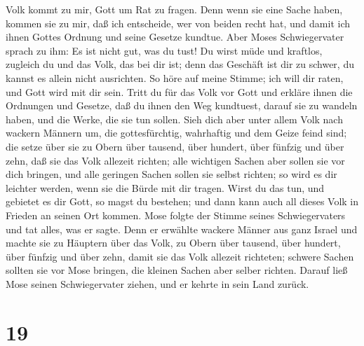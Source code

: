 Volk kommt zu mir, Gott um Rat zu fragen.  Denn wenn sie
eine Sache haben, kommen sie zu mir, daß ich entscheide, wer von beiden
recht hat, und damit ich ihnen Gottes Ordnung und seine Gesetze kundtue.
 Aber Moses Schwiegervater sprach zu ihm: Es ist nicht
gut, was du tust!  Du wirst müde und kraftlos, zugleich
du und das Volk, das bei dir ist; denn das Geschäft ist dir zu schwer,
du kannst es allein nicht ausrichten.  So höre auf meine
Stimme; ich will dir raten, und Gott wird mit dir sein. Tritt du für das
Volk vor Gott  und erkläre ihnen die Ordnungen und
Gesetze, daß du ihnen den Weg kundtuest, darauf sie zu wandeln haben,
und die Werke, die sie tun sollen.  Sieh dich aber unter
allem Volk nach wackern Männern um, die gottesfürchtig, wahrhaftig und
dem Geize feind sind; die setze über sie zu Obern über tausend, über
hundert, über fünfzig und über zehn,  daß sie das Volk
allezeit richten; alle wichtigen Sachen aber sollen sie vor dich
bringen, und alle geringen Sachen sollen sie selbst richten; so wird es
dir leichter werden, wenn sie die Bürde mit dir tragen. 
Wirst du das tun, und gebietet es dir Gott, so magst du bestehen; und
dann kann auch all dieses Volk in Frieden an seinen Ort kommen.
 Mose folgte der Stimme seines Schwiegervaters und tat
alles, was er sagte.  Denn er erwählte wackere Männer aus
ganz Israel und machte sie zu Häuptern über das Volk, zu Obern über
tausend, über hundert, über fünfzig und über zehn,  damit
sie das Volk allezeit richteten; schwere Sachen sollten sie vor Mose
bringen, die kleinen Sachen aber selber richten.  Darauf
ließ Mose seinen Schwiegervater ziehen, und er kehrte in sein Land
zurück.

\hypertarget{section-18}{%
\section{19}\label{section-18}}


